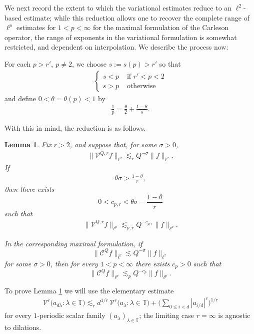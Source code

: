 \documentclass[12pt]{amsart}
\numberwithin{equation}{section}
\newtheorem{lemma}[theorem]{Lemma}
\theoremstyle{definition}
\begin{document}
We next record the extent to which the variational estimates reduce to an
\(\ell^2\)-based estimate; while this reduction allows one to recover the complete range of $\ell^p$ estimates for $1 < p < \infty$ for the maximal formulation of the Carleson operator, the range of exponents in the variational formulation is somewhat restricted, and dependent on interpolation. We describe the process now:

For each $p > r', \ p \neq 2$, we choose $s := s(p) > r'$ so that
\begin{align}
\begin{cases}
    s < p & \text{ if } r' < p <2 \\
    s > p & \text{ otherwise} 
\end{cases}
\end{align}
and define $0 < \theta = \theta(p) < 1$ by
\begin{align}
    \frac{1}{p} = \frac{\theta}{2} + \frac{1-\theta}{s}.
\end{align}

With this in mind, the reduction is as follows.
\begin{lemma}\label{l:red-var-l2}
Fix \(r>2\), and suppose that, for some \(\sigma>0\),
\begin{align}\label{e:red-var-l2-hyp}
    \|\mathcal V^{Q,r}f\|_{\ell^2}
    \lesssim_r
    Q^{-\sigma}\|f\|_{\ell^2}.
\end{align}
If
\begin{align}\label{e:interp-var-l2-condition}
    \theta\sigma>\frac{1-\theta}{r},
\end{align}
then there exists 
\[ 0 < c_{p,r} < \theta\sigma-\frac{1-\theta}{r} \]
such that
\begin{align}\label{e:red-var-l2-conclusion}
    \|\mathcal V^{Q,r}f\|_{\ell^p}
    \lesssim_{p,r}
    Q^{-c_{p,r}}\|f\|_{\ell^p}.
\end{align}

In the corresponding maximal formulation, if
\[
\| \mathcal{C}^Q f\|_{\ell^2}\lesssim Q^{-\sigma}\|f\|_{\ell^2}
\]
for some \(\sigma>0\), then for every \(1<p<\infty\) there exists \(c_p>0\) such that
\[
\| \mathcal{C}^Q f\|_{\ell^p}\lesssim_p Q^{-c_p}\|f\|_{\ell^p}.
\]
\end{lemma}

To prove Lemma \ref{l:red-var-l2} we will use the elementary estimate
\begin{align}\label{e:var-covering-loss}
    \mathcal{V}^r\big(a_{d\lambda}:\lambda\in\mathbb T\big)
    \lesssim_r
    d^{1/r}\,
    \mathcal{V}^r\big(a_\lambda:\lambda\in\mathbb T\big)
    +
    \big(\sum_{0\leq i<d}|a_{i/d}|^r\big)^{1/r}
\end{align}
for every \(1\)-periodic scalar family \((a_\lambda)_{\lambda\in\mathbb T}\); the limiting case $r = \infty$ is agnostic to dilations.
\end{document}
